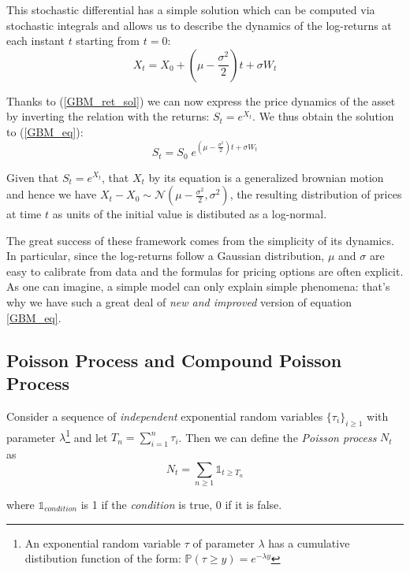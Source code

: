 This stochastic differential has a simple solution which can be computed via stochastic integrals and allows us to describe the dynamics of the log-returns at each instant $t$ starting from $t=0$:
\begin{equation}
	\label{GBM_ret_sol}
	X_t = X_0 + (\mu - 	\frac{\sigma^2}{2}) t + \sigma W_t
\end{equation}

Thanks to (\ref{GBM_ret_sol}) we can now express the price dynamics of the asset by inverting the relation with the returns: $S_t = e^{X_t}$. 
We thus obtain the solution to (\ref{GBM_eq}):
\begin{equation}
	S_t = S_0 \;e^{(\mu - 	\frac{\sigma^2}{2}) t + \sigma W_t}
\end{equation}

Given that $S_t = e^{X_t}$, that $X_t$ by its equation is a generalized brownian motion and hence we have $X_t - X_0 \sim \mathcal{N}(\mu - 	\frac{\sigma^2}{2}, \sigma^2)$, the resulting distribution of prices at time $t$ as units of the initial value is distibuted as a log-normal.

The great success of these framework comes from the simplicity of its dynamics. In particular, since the log-returns follow a Gaussian distribution, $\mu$ and $\sigma$ are easy to calibrate from data and the formulas for pricing options  are often explicit.
As one can imagine, a simple model can only explain simple phenomena: that's why we have such a great deal of \textit{new and improved} version of equation \ref{GBM_eq}.

\subsection{Poisson Process and Compound Poisson Process}
Consider a sequence of \textit{independent} exponential random variables  $\{\tau_i\}_{i\geq1}$ with parameter $\lambda$\footnote{An exponential random variable $\tau$ of parameter $\lambda$ has a cumulative distibution function of the form: $\mathbb{P}(\tau \geq y) = e^{-\lambda y}$} and let $T_n = \sum_{i=1}^{n}\tau_i$. Then we can define the \textit{Poisson process} $N_t$ as
\begin{equation}
 	N_t = \sum_{n\geq 1} \mathds{1}_{t \geq T_n}
\end{equation}

where $\mathds{1}_{condition}$ is 1 if the \textit{condition} is true, 0 if it is false.

